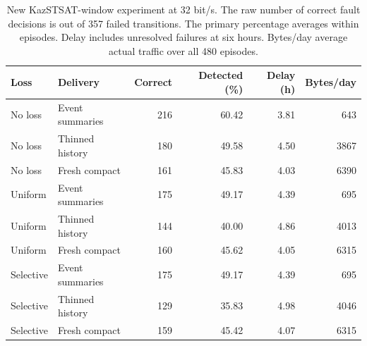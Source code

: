 \begin{table}[!htb]\centering\small
\caption{New KazSTSAT-window experiment at 32 bit/s. The raw number of correct fault decisions is out of 357 failed transitions. The primary percentage averages within episodes. Delay includes unresolved failures at six hours. Bytes/day average actual traffic over all 480 episodes.}\label{tab:loss}
\begin{tabular}{@{}llrrrr@{}}\toprule
Loss & Delivery & Correct & Detected (\%) & Delay (h) & Bytes/day\\\midrule
No loss & Event summaries & 216 & 60.42 & 3.81 & 643\\
No loss & Thinned history & 180 & 49.58 & 4.50 & 3867\\
No loss & Fresh compact & 161 & 45.83 & 4.03 & 6390\\
Uniform & Event summaries & 175 & 49.17 & 4.39 & 695\\
Uniform & Thinned history & 144 & 40.00 & 4.86 & 4013\\
Uniform & Fresh compact & 160 & 45.62 & 4.05 & 6315\\
Selective & Event summaries & 175 & 49.17 & 4.39 & 695\\
Selective & Thinned history & 129 & 35.83 & 4.98 & 4046\\
Selective & Fresh compact & 159 & 45.42 & 4.07 & 6315\\
\bottomrule\end{tabular}\end{table}
